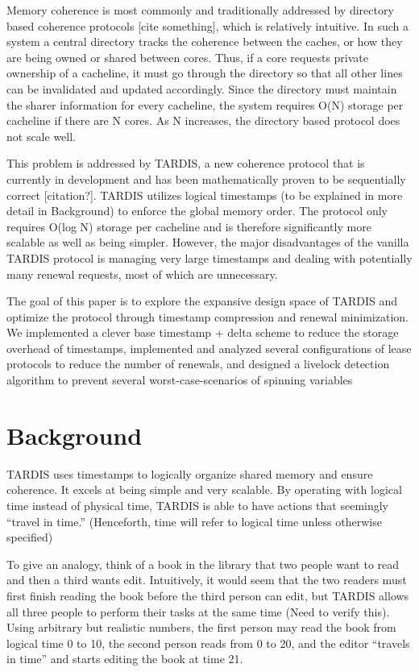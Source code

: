 \documentclass[12pt]{article}
\begin{document}
Memory coherence is most commonly and traditionally addressed by directory based coherence protocols [cite something], which is relatively intuitive. In such a system a central directory tracks the coherence between the caches, or how they are being owned or shared between cores. Thus, if a core requests private ownership of a cacheline, it must go through the directory so that all other lines can be invalidated and updated accordingly. Since the directory must maintain the sharer information for every cacheline, the system requires O(N) storage per cacheline if there are N cores. As N increases, the directory based protocol does not scale well.

This problem is addressed by TARDIS, a new coherence protocol that is currently in development and has been mathematically proven to be sequentially correct [citation?]. TARDIS utilizes logical timestamps (to be explained in more detail in Background) to enforce the global memory order. The protocol only requires O(log N) storage per cacheline and is therefore significantly more scalable as well as being simpler. However, the major disadvantages of the vanilla TARDIS protocol is managing very large timestamps and dealing with potentially many renewal requests, most of which are unnecessary. 

The goal of this paper is to explore the expansive design space of TARDIS and optimize the protocol through timestamp compression and renewal minimization. We implemented a clever base timestamp + delta scheme to reduce the storage overhead of timestamps, implemented and analyzed several configurations of lease protocols to reduce the number of renewals, and designed a livelock detection algorithm to prevent several worst-case-scenarios of spinning variables

\section{Background}
TARDIS uses timestamps to logically organize shared memory and ensure coherence. It excels at being simple and very scalable. By operating with logical time instead of physical time, TARDIS is able to have actions that seemingly “travel in time.” (Henceforth, time will refer to logical time unless otherwise specified)

To give an analogy, think of a book in the library that two people want to read and then a third wants edit. Intuitively, it would seem that the two readers must first finish reading the book before the third person can edit, but TARDIS allows all three people to perform their tasks at the same time (Need to verify this).  Using arbitrary but realistic numbers, the first person may read the book from logical time 0 to 10, the second person reads from 0 to 20, and the editor “travels in time” and starts editing the book at time 21.
\end{document}
